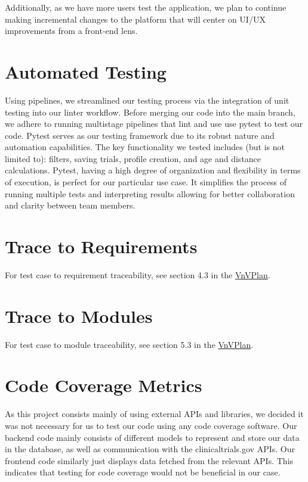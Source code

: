 \documentclass[12pt, titlepage]{article}
\begin{document}
Additionally, as we have more users test the application, we plan to continue making incremental changes
to the platform that will center on UI/UX improvements from a front-end lens.


\section{Automated Testing}
Using pipelines, we streamlined our testing process via the integration of unit
testing into our linter workflow. Before merging our code into the main branch, we adhere
to running multistage pipelines that lint and use use pytest to test our code.
Pytest serves as our testing framework
due to its robust nature and automation capabilities. The key functionality we tested includes (but is not limited to):
filters, saving trials, profile creation, and age and distance calculations. Pytest, having a high degree of organization and flexibility
in terms of execution, is perfect
for our particular use case. It simplifies the process of running multiple tests and interpreting results
allowing for better collaboration and clarity between team members.


\section{Trace to Requirements}

For test case to requirement traceability, see section 4.3 in the \href{https://github.com/davimang/REACH/blob/main/docs/VnVPlan/VnVPlan.pdf}{VnVPlan}.
\section{Trace to Modules}
For test case to module traceability, see section 5.3 in the \href{https://github.com/davimang/REACH/blob/main/docs/VnVPlan/VnVPlan.pdf}{VnVPlan}.

\section{Code Coverage Metrics}

As this project consists mainly of using external APIs and libraries, we decided it was not necessary
for us to test our code using any code coverage software. Our backend code mainly consists of different
models to represent and store our data in the database, as well as communication with the clinicaltrials.gov APIs.
Our frontend code similarly just displays data fetched from the relevant APIs. This indicates that testing for code
coverage would not be beneficial in our case.
\end{document}
